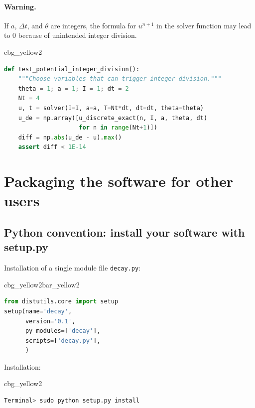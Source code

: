 \documentclass[%
oneside,                 %
final,                   %
10pt]{article}
\newenvironment{_cod_tight}[1]{
   \def\FrameCommand{\colorbox{#1}}
   \FrameRule0.6pt\MakeFramed {\FrameRestore}\vskip3mm}
   {\vskip0mm\endMakeFramed}
\newenvironment{cod}[1]{
\bgroup\rmfamily
\fboxsep=0mm\relax
\begin{_cod_tight}{#1}
\list{}{\parsep=-2mm\parskip=0mm\topsep=0pt\leftmargin=2mm
\rightmargin=2\leftmargin\leftmargin=4pt\relax}
\item\relax}
{\endlist\end{_cod_tight}\egroup}
\newenvironment{_pro_tight}[2]{
   \def\FrameCommand{\color{#2}\vrule width 1mm\normalcolor\colorbox{#1}}
   \FrameRule0.6pt\MakeFramed {\advance\hsize-2mm\FrameRestore}\vskip3mm}
   {\vskip0mm\endMakeFramed}
\newenvironment{pro}[2]{
\bgroup\rmfamily
\fboxsep=0mm\relax
\begin{_pro_tight}{#1}{#2}
\list{}{\parsep=-2mm\parskip=0mm\topsep=0pt\leftmargin=2mm
\rightmargin=2\leftmargin\leftmargin=4pt\relax}
\item\relax}
{\endlist\end{_pro_tight}\egroup}
\begin{document}
\paragraph{Warning.}
If $a$, $\Delta t$, and
$\theta$ are integers, the formula for $u^{n+1}$ in the solver
function may lead to 0 because of unintended integer division.



\begin{cod}{cbg_yellow2}\begin{lstlisting}[language=Python,style=simple,xleftmargin=2mm]
def test_potential_integer_division():
    """Choose variables that can trigger integer division."""
    theta = 1; a = 1; I = 1; dt = 2
    Nt = 4
    u, t = solver(I=I, a=a, T=Nt*dt, dt=dt, theta=theta)
    u_de = np.array([u_discrete_exact(n, I, a, theta, dt)
                     for n in range(Nt+1)])
    diff = np.abs(u_de - u).max()
    assert diff < 1E-14
\end{lstlisting}\end{cod}
\noindent


\section*{Packaging the software for other users}

\subsection*{Python convention: install your software with setup.py}

Installation of a single module file \texttt{decay.py}:

\begin{pro}{cbg_yellow2}{bar_yellow2}\begin{lstlisting}[language=Python,style=simple,xleftmargin=2mm]
from distutils.core import setup
setup(name='decay',
      version='0.1',
      py_modules=['decay'],
      scripts=['decay.py'],
      )
\end{lstlisting}\end{pro}
\noindent

Installation:

\begin{cod}{cbg_yellow2}\begin{lstlisting}[language=bash,style=simple,xleftmargin=2mm]
Terminal> sudo python setup.py install
\end{lstlisting}\end{cod}
\noindent
\end{document}
